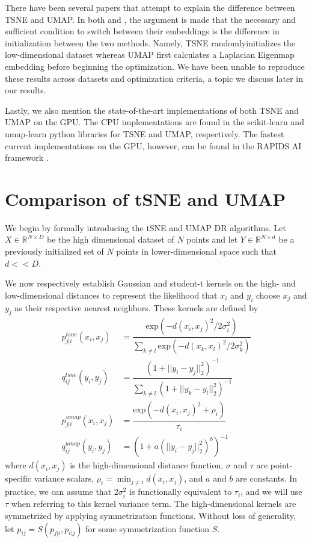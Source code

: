 \documentclass[sigconf, nonacm]{acmart}
\begin{document}
There have been several papers that attempt to explain the difference between TSNE and UMAP. In both \cite{kobak2019umap} and \cite{kobak2021initialization},
the argument is made that the necessary and sufficient condition to switch between their embeddings is the difference in initialization between the two methods.
Namely, TSNE randomlyinitializes the low-dimensional dataset whereas UMAP first calculates a Laplacian Eigenmap \cite{belkin2003laplacian} embedding before
beginning the optimization. We have been unable to reproduce these results across datasets and optimization criteria, a topic we discuss later in our results.

Lastly, we also mention the state-of-the-art implementations of both TSNE and UMAP on the GPU. The CPU implementations are found in the scikit-learn and
umap-learn python libraries for TSNE and UMAP, respectively. The fastest current implementations on the GPU, however, can be found in the RAPIDS AI
framework \cite{nolet2020bringing} \cite{rapidsframework}.

\section{Comparison of tSNE and UMAP} \label{comparison}
We begin by formally introducing the tSNE and UMAP DR algorithms. Let $X \in \mathbb{R}^{N \times D}$ be the high dimensional dataset of $N$ points and let $Y
\in \mathbb{R}^{N \times d}$ be a previously initialized set of $N$ points in lower-dimensional space such that $d << D$. 

We now respectively establish Gaussian and student-t kernels on the high- and low-dimensional distances to represent the likelihood that $x_i$ and $y_i$ choose
$x_j$ and $y_j$ as their respective nearest neighbors. These kernels are defined by
\begin{align}
    p^{tsne}_{j|i}(x_i, x_j) &= \dfrac{\text{exp}(-d(x_i, x_j)^2 / 2 \sigma_i^2)}{\sum_{k \neq l} \text{exp}(-d(x_k, x_l)^2 / 2 \sigma_k^2)} \\[0.5ex]
    q^{tsne}_{ij}(y_i, y_j) &= \dfrac{(1 + ||y_i - y_j||^2_2)^{-1}}{\sum_{k \neq l} (1 + ||y_k - y_l||^2_2)^{-1}} \\[1.5ex]
    p^{umap}_{j|i}(x_i, x_j) &= \dfrac{\text{exp} (-d(x_i, x_j)^2 + \rho_{i})}{\tau_i} \\[0.3ex]
    q^{umap}_{ij}(y_i, y_j) &= \left( 1 + a(||y_i - y_j||^2_2)^b \right) ^{-1}
\end{align}
where $d(x_i, x_j)$ is the high-dimensional distance function, $\sigma$ and $\tau$ are point-specific variance scalars, $\rho_i = \min_{j \neq i} d(x_i, x_j)$,
and $a$ and $b$ are constants. In practice, we can assume that $2 \sigma_i^2$ is functionally equivalent to $\tau_i$, and we will use $\tau$ when referring to
this kernel variance term. The high-dimensional kernels are symmetrized by applying symmetrization functions. Without loss of generality, let $p_{ij}
= S(p_{j|i}, p_{i|j})$ for some symmetrization function $S$.
\end{document}
